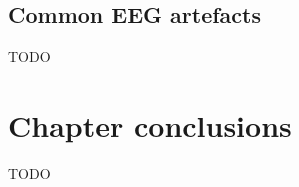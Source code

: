 \subsection{Common EEG artefacts}
\label{subsec:biomedical_signals_measuring_artefacts}

TODO

\section{Chapter conclusions}
\label{sec:biomedical_signals_summary}

TODO